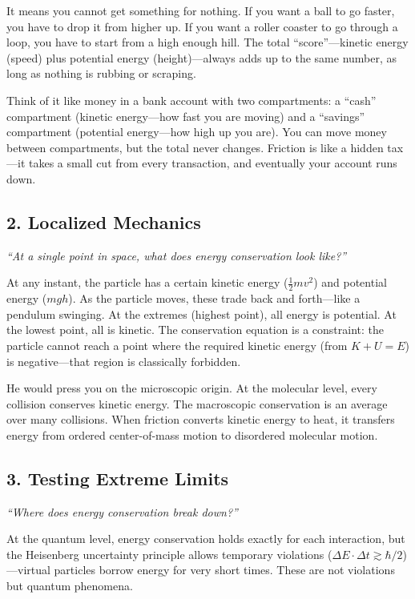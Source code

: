 \documentclass[11pt,openright]{book}
\begin{document}
It means you cannot get something for nothing. If you want a ball to go faster, you have to drop it from higher up. If you want a roller coaster to go through a loop, you have to start from a high enough hill. The total ``score''---kinetic energy (speed) plus potential energy (height)---always adds up to the same number, as long as nothing is rubbing or scraping.

Think of it like money in a bank account with two compartments: a ``cash'' compartment (kinetic energy---how fast you are moving) and a ``savings'' compartment (potential energy---how high up you are). You can move money between compartments, but the total never changes. Friction is like a hidden tax---it takes a small cut from every transaction, and eventually your account runs down.

\subsection*{2. Localized Mechanics}
\textit{``At a single point in space, what does energy conservation look like?''}

At any instant, the particle has a certain kinetic energy ($\frac{1}{2}mv^2$) and potential energy ($mgh$). As the particle moves, these trade back and forth---like a pendulum swinging. At the extremes (highest point), all energy is potential. At the lowest point, all is kinetic. The conservation equation is a constraint: the particle cannot reach a point where the required kinetic energy (from $K + U = E$) is negative---that region is classically forbidden.

He would press you on the microscopic origin. At the molecular level, every collision conserves kinetic energy. The macroscopic conservation is an average over many collisions. When friction converts kinetic energy to heat, it transfers energy from ordered center-of-mass motion to disordered molecular motion.

\subsection*{3. Testing Extreme Limits}
\textit{``Where does energy conservation break down?''}

At the quantum level, energy conservation holds exactly for each interaction, but the Heisenberg uncertainty principle allows temporary violations ($\Delta E \cdot \Delta t \gtrsim \hbar/2$)---virtual particles borrow energy for very short times. These are not violations but quantum phenomena.
\end{document}
